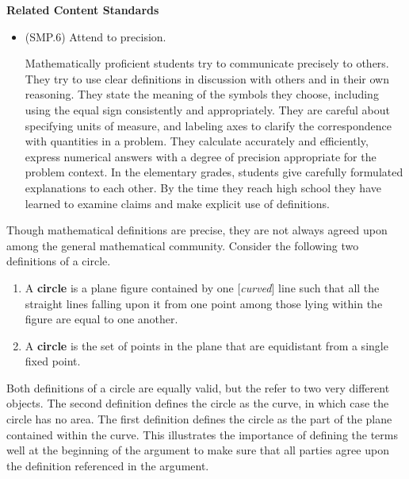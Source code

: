 \documentclass[
]{book}
\providecommand{\tightlist}{%
  \setlength{\itemsep}{0pt}\setlength{\parskip}{0pt}}
\newenvironment{standards}{}{}
\theoremstyle{definition}
\theoremstyle{definition}
\theoremstyle{definition}
\theoremstyle{definition}
\theoremstyle{remark}
\begin{document}
\begin{standards}

\begin{center}
\textbf{Related Content Standards}

\end{center}

\begin{itemize}
\item
  (SMP.6) Attend to precision.

  Mathematically proficient students try to communicate precisely to others. They try to use clear definitions in discussion with others and in their own reasoning. They state the meaning of the symbols they choose, including using the equal sign consistently and appropriately. They are careful about specifying units of measure, and labeling axes to clarify the correspondence with quantities in a problem. They calculate accurately and efficiently, express numerical answers with a degree of precision appropriate for the problem context. In the elementary grades, students give carefully formulated explanations to each other. By the time they reach high school they have learned to examine claims and make explicit use of definitions.
\end{itemize}

\end{standards}

Though mathematical definitions are precise, they are not always agreed upon among the general mathematical community. Consider the following two definitions of a circle.

\begin{enumerate}
\def\labelenumi{\arabic{enumi}.}
\tightlist
\item
  A \textbf{circle} is a plane figure contained by one {[}\emph{curved}{]} line such that all the straight lines falling upon it from one point among those lying within the figure are equal to one another.
\item
  A \textbf{circle} is the set of points in the plane that are equidistant from a single fixed point.
\end{enumerate}

Both definitions of a circle are equally valid, but the refer to two very different objects. The second definition defines the circle as the curve, in which case the circle has no area. The first definition defines the circle as the part of the plane contained within the curve. This illustrates the importance of defining the terms well at the beginning of the argument to make sure that all parties agree upon the definition referenced in the argument.
\end{document}
